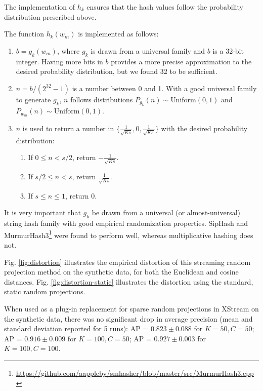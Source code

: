 \documentclass[11pt,onecolumn]{article}
\begin{document}
The implementation of $h_k$ ensures that the hash values follow the probability distribution prescribed above.

The function $h_k(w_m)$ is implemented as follows:
\begin{enumerate}
	\item $b = g_k(w_m)$, where $g_k$ is drawn from a universal family and $b$ is a 32-bit integer. Having more bits in $b$ provides a more precise approximation to the desired probability distribution, but we found 32 to be sufficient.
	\item $n = b/(2^{32}-1)$ is a number between 0 and 1. With a good universal family to generate $g_k$, $n$ follows distributions $P_{g_k}(n) \sim \textrm{Uniform}(0,1)$ and $P_{w_m}(n) \sim \textrm{Uniform}(0,1)$.
	\item $n$ is used to return a number in $\{\frac{1}{\sqrt{Ks}}, 0, \frac{1}{\sqrt{Ks}}\}$ with the desired probability distribution:
		\begin{enumerate}
			\item If $0 \leq n < s/2$, return $-\frac{1}{\sqrt{Ks}}$.
			\item If $s/2 \leq n < s$, return $\frac{1}{\sqrt{Ks}}$.
			\item If $s \leq n \leq 1$, return 0.
		\end{enumerate}
\end{enumerate}

It is very important that $g_k$ be drawn from a universal (or almost-universal) string hash family with good empirical randomization properties. SipHash \parencite{aumasson2012siphash} and MurmurHash3\footnote{\url{https://github.com/aappleby/smhasher/blob/master/src/MurmurHash3.cpp}} were found to perform well, whereas multiplicative hashing does not.

Fig. \ref{fig:distortion} illustrates the empirical distortion of this streaming random projection method on the synthetic data, for both the Euclidean and cosine distances. Fig. \ref{fig:distortion-static} illustrates the distortion using the standard, static random projections.

When used as a plug-in replacement for sparse random projections in XStream on the synthetic data, there was no significant drop in average precision (mean and standard deviation reported for 5 runs): AP = $0.823 \pm 0.088$ for $K = 50, C = 50$; AP = $0.916 \pm 0.009$ for $K = 100, C = 50$; AP = $0.927 \pm 0.003$ for $K = 100, C = 100$.
\end{document}

